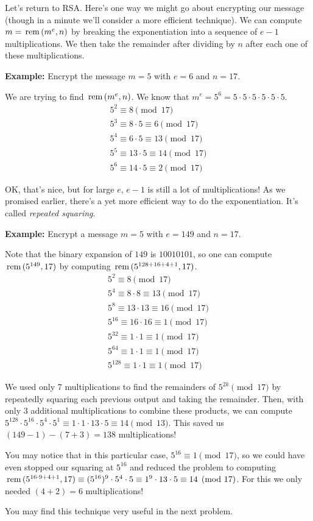 \documentclass[12pt]{article}
\begin{document}
{\noindent
Let's return to RSA. Here's one way we might go about encrypting our message (though in a minute we'll consider a more efficient technique). We can compute $m=\operatorname{\,rem\,}(m^e,n)$ by breaking the exponentiation into a sequence of $e-1$ multiplications. We then take the remainder after dividing by $n$ after each one of these multiplications.

\noindent
\textbf{Example:} Encrypt the message $m=5$ with $e=6$ and $n=17$.

We are trying to find $\operatorname{\,rem\,}(m^e, n)$. We know that $m^{e} = 5^{6} = 5 \cdot 5 \cdot 5 \cdot 5 \cdot 5 \cdot 5$.  
\begin{align*}
5^2 \equiv 8 \pmod{17} \\
5^3 \equiv 8 \cdot 5 \equiv 6 \pmod{17} \\
5^4 \equiv 6 \cdot 5 \equiv 13 \pmod{17} \\
5^5 \equiv 13 \cdot 5 \equiv 14 \pmod{17} \\
5^6 \equiv 14 \cdot 5 \equiv 2 \pmod{17}
\end{align*}

\noindent
OK, that's nice, but for large $e$, $e-1$ is still a lot of multiplications! As we promised earlier, there's a yet more efficient way to do the exponentiation. It's called {\em repeated squaring}.

\noindent
\textbf{Example:} Encrypt a message $m=5$ with $e=149$ and $n=17$.

Note that the binary expansion of $149$ is $10010101$, so one can compute $\operatorname{\,rem\,}(5^{149},17)$ by computing $\operatorname{\,rem\,}(5^{128+16+4+1},17)$.
\begin{align*}
5^2 \equiv 8 \pmod{17} \\
5^4 \equiv 8 \cdot 8 \equiv 13 \pmod{17} \\
5^8 \equiv 13 \cdot 13 \equiv 16 \pmod{17} \\
5^{16} \equiv 16 \cdot 16 \equiv 1 \pmod{17} \\
5^{32} \equiv 1 \cdot 1 \equiv 1 \pmod{17} \\
5^{64} \equiv 1 \cdot 1 \equiv 1 \pmod{17} \\
5^{128} \equiv 1 \cdot 1 \equiv 1 \pmod{17}
\end{align*}

We used only 7 multiplications to find the remainders of $5^{2k} \pmod{17}$ by repeatedly squaring each previous output and taking the remainder.  Then, with only $3$ additional
multiplications to combine these products, we can compute $5^{128} \cdot 5^{16} \cdot 5^4 \cdot 5^1 \equiv 1 \cdot 1 \cdot 13 \cdot 5 \equiv 14 \pmod{13}$. This saved us $(149-1)-(7+3) = 138$ multiplications!

You may notice that in this particular case, $5^{16} \equiv 1 \pmod{17}$, so we could have even stopped our squaring at $5^{16}$ and reduced the problem to computing $\operatorname{\,rem\,}(5^{16 \cdot 9 + 4 + 1},17) \equiv (5^{16})^{9} \cdot 5^4 \cdot 5 \equiv 1^{9} \cdot 13 \cdot 5 \equiv 14 \pmod{17}$. For this we only needed $(4+2) = 6$ multiplications!

You may find this technique very useful in the next problem.
\newpage
}
\end{document}
